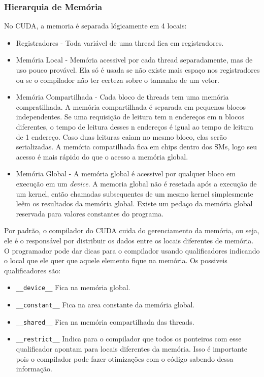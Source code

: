 \subsubsection{Hierarquia de Memória}
No CUDA, a memoria é separada lógicamente em 4 locais:

\begin{itemize}
  \item Registradores - Toda variável de uma thread fica em registradores.
  \item Memória Local - Memória acessivel por cada thread separadamente, mas de uso pouco provável. Ela só é usada se
          não existe mais espaço nos registradores ou se o compilador não ter certeza sobre o tamanho de um vetor.
  \item Memória Compartilhada - Cada bloco de threads tem uma memória compratilhada. A memória compartilhada é separada em
          pequenos blocos independentes. Se uma requisição de leitura tem n endereços em n blocos diferentes, o tempo de leitura
          desses n endereços é igual ao tempo de leitura de 1 endereço. Caso duas leituras caiam no mesmo bloco, elas serão
          serializadas. A memória compatilhada fica em chips dentro dos SMs, logo seu acesso é mais rápido do que o acesso a
          memória global.
  \item Memória Global - A memória global é acessivel por qualquer bloco em execução em um \textit{device}. A memoria global não é
          resetada após a execução de um kernel, então chamadas subsequentes de um mesmo kernel simplesmente leêm os resultados
          da memória global. Existe um pedaço da memória global reservada para valores constantes do programa.
\end{itemize}

Por padrão, o compilador do CUDA cuida do gerenciamento da memória, ou seja, ele é o responsável por distribuir os dados 
entre os locais diferentes de memória. O programador pode dar dicas para o compilador usando qualificadores indicando o local
que ele quer que aquele elemento fique na memória. Os possiveis qualificadores são:
\begin{itemize}
  \item \verb#__device__# Fica na memória global.
  \item \verb#__constant__#   Fica na area constante da memória global.
  \item \verb#__shared__# Fica na memória compartilhada das threads.
  \item \verb#__restrict__# Indica para o compilador que todos os ponteiros com esse qualificador apontam para locais diferentes
                            da memória. Isso é importante pois o compilador pode fazer otimizações com o código sabendo dessa informação.   
\end{itemize}

